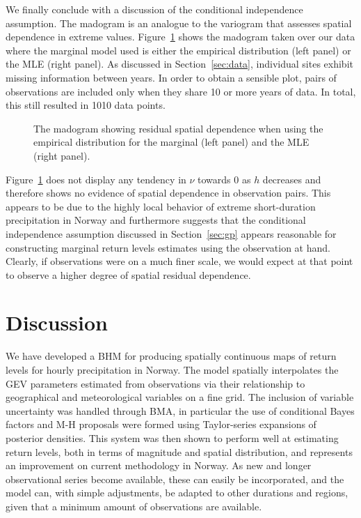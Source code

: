 \documentclass[11pt,english]{article}
\begin{document}
\newpage

We finally conclude with a discussion of the conditional independence assumption.  The madogram \citep{cooley_et_2006} is an analogue to the variogram that assesses spatial dependence in extreme values.  Figure~\ref{fig:madogram} shows the madogram taken over our data where the marginal model used is either the empirical distribution (left panel) or the MLE (right panel).  As discussed in Section~\ref{sec:data}, individual sites exhibit missing information between years.  In order to obtain a sensible plot, pairs of observations are included only when they share 10 or more years of data.  In total, this still resulted in 1010 data points.

\begin{figure}[htp]
\begin{center}
\caption{The madogram showing residual spatial dependence when using the empirical distribution for the marginal (left panel) and the MLE (right panel).}\label{fig:madogram}
\end{center}
\end{figure}

Figure~\ref{fig:madogram} does not display any tendency in $\nu$ towards $0$ as $h$ decreases and therefore shows no evidence of spatial dependence in observation pairs.  This appears to be due to the highly local behavior of extreme short-duration precipitation in Norway and furthermore suggests that the conditional independence assumption discussed in Section~\ref{sec:gp} appears reasonable for constructing marginal return levels estimates using the observation at hand.  Clearly, if observations were on a much finer scale, we would expect at that point to observe a higher degree of spatial residual dependence.

\section{Discussion}\label{sec:conclude}

We have developed a BHM for producing spatially continuous maps of return levels for hourly precipitation in Norway. The model spatially interpolates the GEV parameters estimated from observations via their relationship to geographical and meteorological variables on a fine grid. The inclusion of variable uncertainty was handled through BMA, in particular the use of conditional Bayes factors and M-H proposals were formed using Taylor-series expansions of posterior densities. This system was then shown to perform well at estimating return levels, both in terms of magnitude and spatial distribution, and represents an improvement on current methodology in Norway. As new and longer observational series become available, these can easily be incorporated, and the model can, with simple adjustments, be adapted to other durations and regions, given that a minimum amount of observations are available.   
\end{document}
